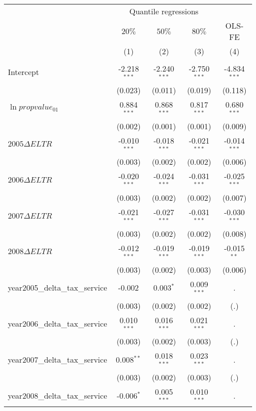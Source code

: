 \begin{table}[H]
  \centering
  \begin{tabular}{@{}lcccc@{}}
  \toprule
                         & \multicolumn{3}{c}{Quantile regressions} &           \\ \cmidrule(lr){2-4}
                         & $20\%$       & $50\%$      & $80\%$      & OLS-FE    \\
                         & (1)          & (2)         & (3)         & (4)       \\ \midrule
  \multicolumn{5}{l}{}                                                          \\
  Intercept & -2.218$^{***}$ & -2.240$^{***}$ & -2.750$^{***}$ & -4.834$^{***}$ \\
  & (0.023) & (0.011) & (0.019) &  (0.118) \\
  $\ln{propvalue_{01}}$ & 0.884$^{***}$ & 0.868$^{***}$ & 0.817$^{***}$  & 0.680$^{***}$ \\
  & (0.002) & (0.001) & (0.001) & (0.009) \\
 $2005\Delta ELTR$ & -0.010$^{***}$ & -0.018$^{***}$ & -0.021$^{***}$  & -0.014$^{***}$ \\
  & (0.003) & (0.002) & (0.002) & (0.006) \\
  $2006\Delta ELTR$ & -0.020$^{***}$ & -0.024$^{***}$ & -0.031$^{***}$  & -0.025$^{***}$ \\
  & (0.003) & (0.002) & (0.002) & (0.007)  \\
  $2007\Delta ELTR$ & -0.021$^{***}$ & -0.027$^{***}$ & -0.031$^{***}$  & -0.030$^{***}$ \\
  & (0.003) & (0.002) & (0.002) & (0.008) \\
  $2008\Delta ELTR$ & -0.012$^{***}$ & -0.019$^{***}$ & -0.019$^{***}$ & -0.015$^{**}$ \\
  & (0.003) & (0.002) & (0.003) & (0.006) \\ 
  year2005_delta_tax_service & -0.002$^{}$ & 0.003$^{*}$ & 0.009$^{***}$ & . \\
  & (0.003) & (0.002) & (0.002) & (.) \\
  year2006_delta_tax_service & 0.010$^{***}$ & 0.016$^{***}$ & 0.021$^{***}$ & . \\
  & (0.003) & (0.002) & (0.003) & (.) \\
  year2007_delta_tax_service & 0.008$^{**}$ & 0.018$^{***}$ & 0.023$^{***}$ & .\\
  & (0.003) & (0.002) & (0.003) & (.) \\
  year2008_delta_tax_service & -0.006$^{*}$ & 0.005$^{***}$ & 0.010$^{***}$ & . \\

\end{tabular}
\end{table}

